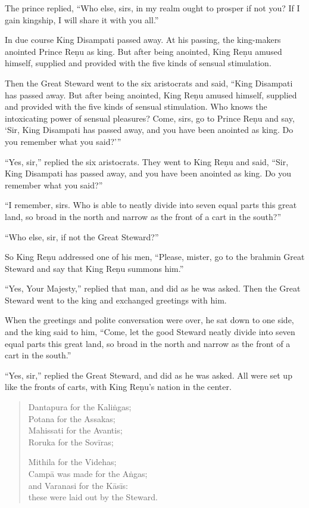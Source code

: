 \documentclass[12pt,openany]{book}%
\begin{document}
The prince replied, “Who else, sirs, in my realm ought to prosper if not you? If I gain kingship, I will share it with you all.” 

In due course King Disampati passed away. At his passing, the king-makers anointed Prince \textsanskrit{Reṇu} as king. But after being anointed, King \textsanskrit{Reṇu} amused himself, supplied and provided with the five kinds of sensual stimulation. 

Then the Great Steward went to the six aristocrats and said, “King Disampati has passed away. But after being anointed, King \textsanskrit{Reṇu} amused himself, supplied and provided with the five kinds of sensual stimulation. Who knows the intoxicating power of sensual pleasures? Come, sirs, go to Prince \textsanskrit{Reṇu} and say, ‘Sir, King Disampati has passed away, and you have been anointed as king. Do you remember what you said?’” 

“Yes, sir,” replied the six aristocrats. They went to King \textsanskrit{Reṇu} and said, “Sir, King Disampati has passed away, and you have been anointed as king. Do you remember what you said?” 

“I remember, sirs. Who is able to neatly divide into seven equal parts this great land, so broad in the north and narrow as the front of a cart in the south?” 

“Who else, sir, if not the Great Steward?” 

So King \textsanskrit{Reṇu} addressed one of his men, “Please, mister, go to the brahmin Great Steward and say that King \textsanskrit{Reṇu} summons him.” 

“Yes, Your Majesty,” replied that man, and did as he was asked. Then the Great Steward went to the king and exchanged greetings with him. 

When the greetings and polite conversation were over, he sat down to one side, and the king said to him, “Come, let the good Steward neatly divide into seven equal parts this great land, so broad in the north and narrow as the front of a cart in the south.” 

“Yes, sir,” replied the Great Steward, and did as he was asked. All were set up like the fronts of carts, with King \textsanskrit{Reṇu}’s nation in the center. 

\begin{verse}%
Dantapura for the \textsanskrit{Kaliṅgas}; \\
Potana for the Assakas; \\
Mahissati for the Avantis; \\
Roruka for the \textsanskrit{Sovīras}; 

Mithila for the Videhas; \\
\textsanskrit{Campā} was made for the \textsanskrit{Aṅgas}; \\
and Varanasi for the \textsanskrit{Kāsīs}: \\
these were laid out by the Steward. 

%
\end{verse}
\end{document}
